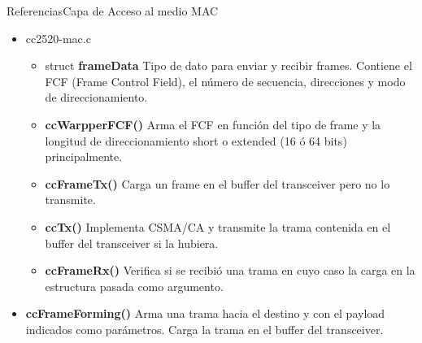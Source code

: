 \documentclass[aspectratio=169]{beamer}
\begin{document}
\begin{frame}[t]{Referencias}{Capa de Acceso al medio MAC}
	\begin{itemize}
		\item cc2520-mac.c
		\vspace{5px}
		\begin{itemize}
			\item struct \textbf{frameData} Tipo de dato para enviar y recibir frames. Contiene el FCF (Frame Control Field), el número de secuencia, direcciones y modo de direccionamiento.
			\vspace{5px}
			\item \textbf{ccWarpperFCF()} Arma el FCF en función del tipo de frame y la longitud de direccionamiento short o extended (16 ó 64 bits) principalmente.
			\vspace{5px}
			\item \textbf{ccFrameTx()} Carga un frame en el buffer del transceiver pero no lo transmite.
			\vspace{5px}
			\item \textbf{ccTx()} Implementa CSMA/CA y transmite la trama contenida en el buffer del transceiver si la hubiera.
			\vspace{5px}
			\item \textbf{ccFrameRx()} Verifica si se recibió una trama en cuyo caso la carga en la estructura pasada como argumento.
		\end{itemize}
		\vspace{10px}
		\item \textbf{ccFrameForming()} Arma una trama hacia el destino  y con el payload indicados como parámetros. Carga la trama en el buffer del transceiver.
	\end{itemize}

\end{frame}
\end{document}
